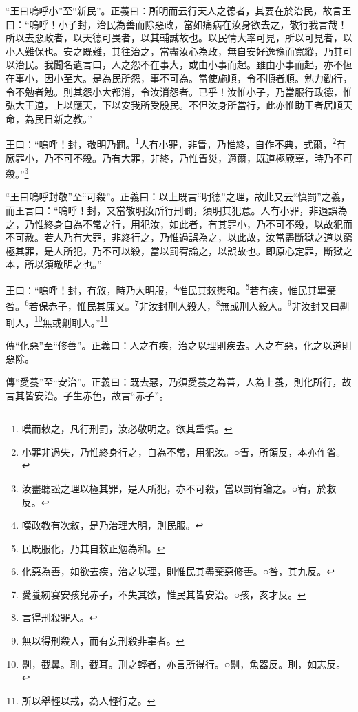 {\noindent\shu{}\fzkt “王曰嗚呼小”至“新民”。正義曰：所明而云行天人之德者，其要在於治民，故言王曰：“嗚呼！小子封，治民為善而除惡政，當如痛病在汝身欲去之，敬行我言哉！所以去惡政者，以天德可畏者，以其輔誠故也。以民情大率可見，所以可見者，以小人難保也。安之既難，其往治之，當盡汝心為政，無自安好逸豫而寬縱，乃其可以治民。我聞名遺言曰，人之怨不在事大，或由小事而起。雖由小事而起，亦不恆在事小，因小至大。是為民所怨，事不可為。當使施順，令不順者順。勉力勸行，令不勉者勉。則其怨小大都消，令汝消怨者。已乎！汝惟小子，乃當服行政德，惟弘大王道，上以應天，下以安我所受殷民。不但汝身所當行，此亦惟助王者居順天命，為民日新之教。” \par}

王曰：“嗚呼！封，敬明乃罰。\footnote{嘆而敕之，凡行刑罰，汝必敬明之。欲其重慎。}人有小罪，非眚，乃惟終，自作不典，式爾，\footnote{小罪非過失，乃惟終身行之，自為不常，用犯汝。○眚，所領反，本亦作省。}有厥罪小，乃不可不殺。乃有大罪，非終，乃惟眚災，適爾，既道極厥辜，時乃不可殺。”\footnote{汝盡聽訟之理以極其罪，是人所犯，亦不可殺，當以罰宥論之。○宥，於救反。}

{\noindent\shu{}\fzkt “王曰嗚呼封敬”至“可殺”。正義曰：以上既言“明德”之理，故此又云“慎罰”之義，而王言曰：“嗚呼！封，又當敬明汝所行刑罰，須明其犯意。人有小罪，非過誤為之，乃惟終身自為不常之行，用犯汝，如此者，有其罪小，乃不可不殺，以故犯而不可赦。若人乃有大罪，非終行之，乃惟過誤為之，以此故，汝當盡斷獄之道以窮極其罪，是人所犯，乃不可以殺，當以罰宥論之，以誤故也。即原心定罪，斷獄之本，所以須敬明之也。” \par}

王曰：“嗚呼！封，有敘，時乃大明服，\footnote{嘆政教有次敘，是乃治理大明，則民服。}惟民其敕懋和。\footnote{民既服化，乃其自敕正勉為和。}若有疾，惟民其畢棄咎。\footnote{化惡為善，如欲去疾，治之以理，則惟民其盡棄惡修善。○咎，其九反。}若保赤子，惟民其康乂。\footnote{愛養紉宴安孩兒赤子，不失其欲，惟民其皆安治。○孩，亥才反。}非汝封刑人殺人，\footnote{言得刑殺罪人。}無或刑人殺人。\footnote{無以得刑殺人，而有妄刑殺非辜者。}非汝封又曰劓刵人，\footnote{劓，截鼻。刵，截耳。刑之輕者，亦言所得行。○劓，魚器反。刵，如志反。}無或劓刵人。”\footnote{所以舉輕以戒，為人輕行之。}


{\noindent\zhuan{}\fzbyks 傳“化惡”至“修善”。正義曰：人之有疾，治之以理則疾去。人之有惡，化之以道則惡除。 \par}

{\noindent\zhuan{}\fzbyks 傳“愛養”至“安治”。正義曰：既去惡，乃須愛養之為善，人為上養，則化所行，故言其皆安治。子生赤色，故言“赤子”。 \par}

